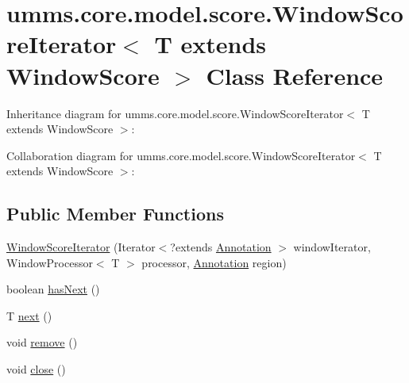 \hypertarget{classumms_1_1core_1_1model_1_1score_1_1_window_score_iterator_3_01_t_01extends_01_window_score_01_4}{\section{umms.\+core.\+model.\+score.\+Window\+Score\+Iterator$<$ T extends Window\+Score $>$ Class Reference}
\label{classumms_1_1core_1_1model_1_1score_1_1_window_score_iterator_3_01_t_01extends_01_window_score_01_4}
}


Inheritance diagram for umms.\+core.\+model.\+score.\+Window\+Score\+Iterator$<$ T extends Window\+Score $>$\+:


Collaboration diagram for umms.\+core.\+model.\+score.\+Window\+Score\+Iterator$<$ T extends Window\+Score $>$\+:
\subsection*{Public Member Functions}
\begin{DoxyCompactItemize}
\item 
\hyperlink{classumms_1_1core_1_1model_1_1score_1_1_window_score_iterator_3_01_t_01extends_01_window_score_01_4_a5efa8c8abde6c354829a49887d525d31}{Window\+Score\+Iterator} (Iterator$<$?extends \hyperlink{interfaceumms_1_1core_1_1annotation_1_1_annotation}{Annotation} $>$ window\+Iterator, Window\+Processor$<$ T $>$ processor, \hyperlink{interfaceumms_1_1core_1_1annotation_1_1_annotation}{Annotation} region)
\item 
boolean \hyperlink{classumms_1_1core_1_1model_1_1score_1_1_window_score_iterator_3_01_t_01extends_01_window_score_01_4_a5500a28b857d070818bb9be32314ef3d}{has\+Next} ()
\item 
T \hyperlink{classumms_1_1core_1_1model_1_1score_1_1_window_score_iterator_3_01_t_01extends_01_window_score_01_4_ac15d458c09d678b67213b98cc7605d3e}{next} ()
\item 
void \hyperlink{classumms_1_1core_1_1model_1_1score_1_1_window_score_iterator_3_01_t_01extends_01_window_score_01_4_af9910c37b9bf53b7791be3646178d0fe}{remove} ()
\item 
void \hyperlink{classumms_1_1core_1_1model_1_1score_1_1_window_score_iterator_3_01_t_01extends_01_window_score_01_4_a6495f8883cc968e1260c819990b6c807}{close} ()
\end{DoxyCompactItemize}


